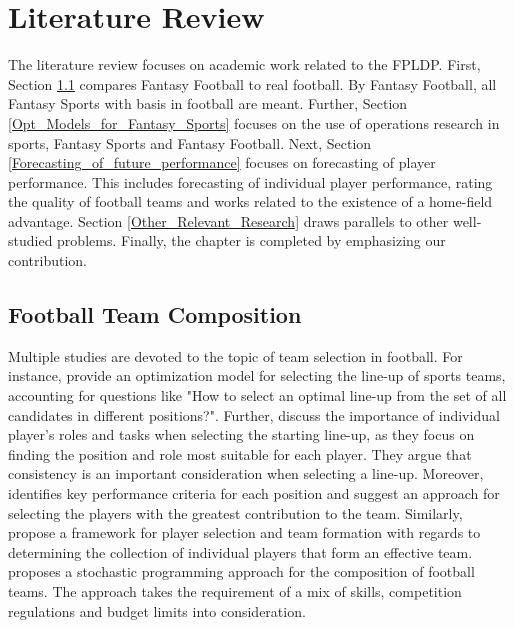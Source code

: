 
\chapter{Literature Review}

The literature review focuses on academic work related to the FPLDP. First, Section \ref{Literature_fantasy_real} compares Fantasy Football to real football. By Fantasy Football, all Fantasy Sports with basis in football are meant. Further, Section \ref{Opt_Models_for_Fantasy_Sports} focuses on the use of operations research in sports, Fantasy Sports and Fantasy Football. Next, Section \ref{Forecasting_of_future_performance} focuses on forecasting of player performance. This includes forecasting of individual player performance, rating the quality of football teams and works related to the existence of a home-field advantage. Section \ref{Other_Relevant_Research} draws parallels to other well-studied problems. Finally, the chapter is completed by emphasizing our contribution.

\section{Football Team Composition} \label{Literature_fantasy_real}

Multiple studies are devoted to the topic of team selection in football. For instance, \cite{Boon} provide an optimization model for selecting the line-up of sports teams, accounting for questions like "How to select an optimal line-up from the set of all candidates in different positions?". Further, \cite{Trninic} discuss the importance of individual player's roles and tasks when selecting the starting line-up, as they focus on finding the position and role most suitable for each player. They argue that consistency is an important consideration when selecting a line-up. Moreover, \cite{Ozceylan} identifies key performance criteria for each position and suggest an approach for selecting the players with the greatest contribution to the team. Similarly, \cite{Tavana} propose a framework for player selection and team formation with regards to determining the collection of individual players that form an effective team. \cite{Pantuso} proposes a stochastic programming approach for the composition of football teams. The approach takes the requirement of a mix of skills, competition regulations and budget limits into consideration.


